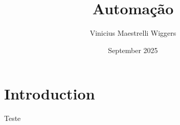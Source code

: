 \documentclass{article}
\title{Automação}
\author{Vinicius Maestrelli Wiggers}
\date{September 2025}
\begin{document}
\maketitle

\section{Introduction}
Teste
\end{document}
